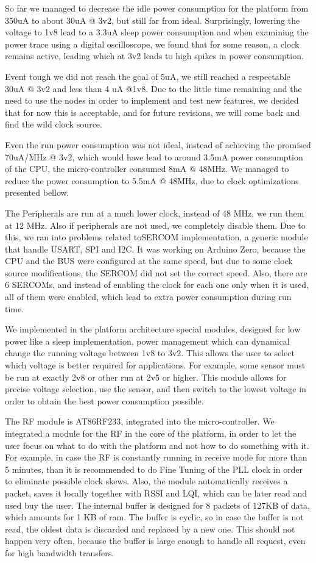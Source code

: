 So far we managed to decrease the idle power consumption for the platform from 350uA to about 30uA @ 3v2, but still far from ideal. Surprisingly, lowering the voltage to 1v8 lead to a 3.3uA sleep power consumption and when examining the power trace using a digital oscilloscope, we found that for some reason, a clock remains active, leading which at 3v2 leads to high spikes in power consumption.

Event tough we did not reach the goal of 5uA, we still reached a respectable 30uA @ 3v2 and less than 4 uA @1v8. Due to the little time remaining and the need to use the nodes in order to implement and test new features, we decided that for now this is acceptable, and for future revisions, we will come back and find the wild clock source.

Even the run power consumption was not ideal, instead of achieving the promised 70uA/MHz @ 3v2, which would have lead to around 3.5mA power consumption of the CPU, the micro-controller consumed 8mA @ 48MHz. We managed to reduce the power consumption to 5.5mA @ 48MHz, due to clock optimizations presented bellow.

The Peripherals are run at a much lower clock, instead of 48 MHz, we run them at 12 MHz. Also if peripherals are not used, we completely disable them. Due to this, we ran into problems related toSERCOM implementation, a generic module that handle USART, SPI and I2C. It was working on Arduino Zero, because the CPU and the BUS were configured at the same speed, but due to some clock source modifications, the SERCOM did not set the correct speed. Also, there are 6 SERCOMs, and instead of enabling the clock for each one only when it is used, all of them were enabled, which lead to extra power consumption during run time.

We implemented in the platform architecture special modules, designed for low power like a sleep implementation, power management which can dynamical change the running voltage between 1v8 to 3v2. This allows the user to select which voltage is better required for applications. For example, some sensor must be run at exactly 2v8 or other run at 2v5 or higher. This module allows for precise voltage selection, use the sensor, and then switch to the lowest voltage in order to obtain the best power consumption possible.

The RF module is AT86RF233, integrated into the micro-controller. We integrated a module for the RF in the core of the platform, in order to let the user focus on what to do with the platform and not how to do something with it. For example, in case the RF is constantly running in receive mode for more than 5 minutes, than it is recommended to do Fine Tuning of the PLL clock in order to eliminate possible clock skews. Also, the module automatically receives a packet, saves it locally together with RSSI and LQI, which can be later read and used buy the user. The internal buffer is designed for 8 packets of 127KB of data, which amounts for 1 KB of ram. The buffer is cyclic, so in case the buffer is not read, the oldest data is discarded and replaced by a new one. This should not happen very often, because the buffer is large enough to handle all request, even for high bandwidth transfers.

